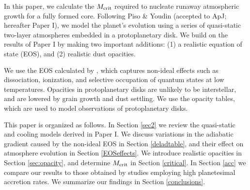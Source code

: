 \documentclass[apj]{emulateapj}
\begin{document}
In this paper, we calculate the $M_{\rm crit}$ required to nucleate runaway atmospheric growth for a fully formed core.  Following Piso \& Youdin (accepted to ApJ; hereafter Paper I), we model the planet's evolution using a series of quasi-static two-layer atmospheres embedded in a protoplanetary disk. We build on the results of Paper I by making two important additions: (1) a realistic equation of state (EOS), and (2) realistic dust opacities.

We use the EOS calculated by \citet{saumon95}, which captures non-ideal effects such as dissociation, ionization, and selective occupation of quantum states at low temperatures.  Opacities in protoplanetary disks are unlikely to be interstellar, and are lowered by grain growth and dust settling. We use the \citet{dalessio01} opacity tables, which are used to model observations of protoplanetary disks.

This paper is organized as follows. In Section \ref{sec2} we review the quasi-static and cooling models derived in Paper I. We discuss variations in the adiabatic gradient caused by the non-ideal EOS in Section \ref{deladtable}, and their effect on atmosphere evolution in Section \ref{EOSeffects}.  We introduce realistic opacities in Section \ref{sec:opacity}, and determine $M_{\rm crit}$ in Section \ref{critical}. In Section \ref{acc} we compare our results to those obtained by studies employing high planetesimal accretion rates. We summarize our findings in Section \ref{conclusions}.



\end{document}
